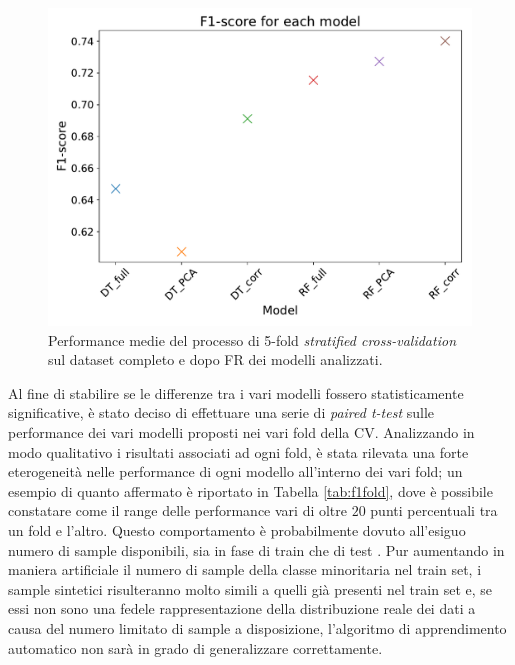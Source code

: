 \begin{figure}
	\centering
	\includegraphics[width=1\linewidth]{images/fscore}
	\caption{Performance medie del processo di 5-fold \textit{stratified cross-validation} sul dataset completo e dopo FR dei modelli analizzati.}
	\label{fig:fscore}
\end{figure}
Al fine di stabilire se le differenze tra i vari modelli fossero statisticamente significative, è stato deciso di effettuare una serie di \textit{paired t-test} sulle performance dei vari modelli proposti nei vari fold della CV.
Analizzando in modo qualitativo i risultati associati ad ogni fold, è stata rilevata una forte eterogeneità nelle performance di ogni modello all'interno dei vari fold; un esempio di quanto affermato è riportato in Tabella \ref{tab:f1fold}, dove è possibile constatare come il range delle performance vari di oltre $20$ punti percentuali tra un fold e l'altro. Questo comportamento è probabilmente dovuto all'esiguo numero di sample disponibili, sia in fase di train che di test . Pur aumentando in maniera artificiale il numero di sample della classe minoritaria nel train set, i sample sintetici risulteranno molto simili a quelli già presenti nel train set e, se essi non sono una fedele rappresentazione della distribuzione reale dei dati a causa del numero limitato di sample a disposizione, l'algoritmo di apprendimento automatico non sarà in grado di generalizzare correttamente. 
